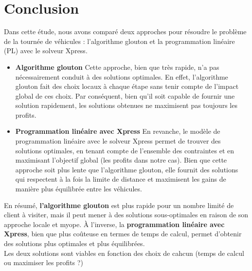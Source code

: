 \documentclass[a4paper, 12pt, DIV=12]{scrartcl}
\begin{document}
\section{Conclusion}

Dans cette étude, nous avons comparé deux approches pour résoudre le problème de la tournée de véhicules : l'algorithme glouton et la programmation linéaire (PL) avec le solveur Xpress.\\
\begin{itemize}
    \item \textbf{Algorithme glouton}
    Cette approche, bien que très rapide, n'a pas nécessairement conduit à des solutions optimales. En effet, l'algorithme glouton fait des choix locaux à chaque étape sans tenir compte de l'impact global de ces choix. Par conséquent, bien qu'il soit capable de fournir une solution rapidement, les solutions obtenues ne maximisent pas toujours les profits.\\
    \item \textbf{Programmation linéaire avec Xpress}
    En revanche, le modèle de programmation linéaire avec le solveur Xpress permet de trouver des solutions optimales, en tenant compte de l'ensemble des contraintes et en maximisant l'objectif global (les profits dans notre cas). Bien que cette approche soit plus lente que l'algorithme glouton, elle fournit des solutions qui respectent à la fois la limite de distance et maximisent les gains de manière plus équilibrée entre les véhicules.\\
\end{itemize}

En résumé, \textbf{l'algorithme glouton }est plus rapide pour un nombre limité de client à visiter, mais il peut mener à des solutions sous-optimales en raison de son approche locale et myope. À l'inverse, la \textbf{programmation linéaire avec Xpress}, bien que plus coûteuse en termes de temps de calcul, permet d'obtenir des solutions plus optimales et plus équilibrées.\\

Les deux solutions sont viables en fonction des choix de cahcun (temps de calcul ou maximiser les profits ?)
\end{document}
